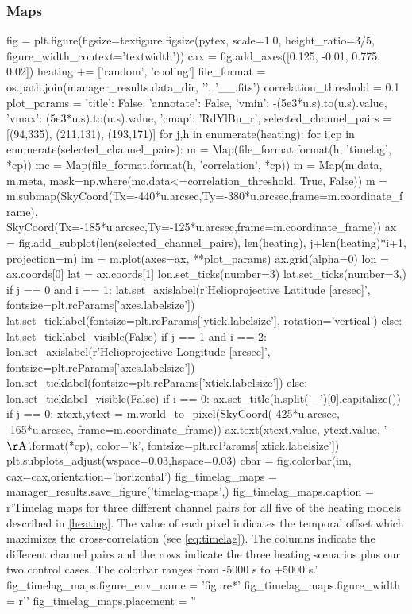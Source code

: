 \subsubsection{Maps}\label{timelag_maps}

\begin{pycode}
fig = plt.figure(figsize=texfigure.figsize(pytex, scale=1.0, height_ratio=3/5,
                                           figure_width_context='textwidth'))
cax = fig.add_axes([0.125, -0.01, 0.775, 0.02])
heating += ['random', 'cooling']
file_format = os.path.join(manager_results.data_dir, '{}', '{}_{}_{}.fits')
correlation_threshold = 0.1
plot_params = {'title': False, 'annotate': False, 'vmin': -(5e3*u.s).to(u.s).value,
               'vmax': (5e3*u.s).to(u.s).value, 'cmap': 'RdYlBu_r',}
selected_channel_pairs = [(94,335), (211,131), (193,171)]
for j,h in enumerate(heating):
    for i,cp in enumerate(selected_channel_pairs):
        m = Map(file_format.format(h, 'timelag', *cp))
        mc = Map(file_format.format(h, 'correlation', *cp))
        m = Map(m.data, m.meta, mask=np.where(mc.data<=correlation_threshold, True, False))
        m = m.submap(SkyCoord(Tx=-440*u.arcsec,Ty=-380*u.arcsec,frame=m.coordinate_frame),
                     SkyCoord(Tx=-185*u.arcsec,Ty=-125*u.arcsec,frame=m.coordinate_frame))
        ax = fig.add_subplot(len(selected_channel_pairs), len(heating), j+len(heating)*i+1,
                             projection=m)
        im = m.plot(axes=ax, **plot_params)
        ax.grid(alpha=0)
        lon = ax.coords[0]
        lat = ax.coords[1]
        lon.set_ticks(number=3)
        lat.set_ticks(number=3,) 
        if j == 0 and i == 1:
            lat.set_axislabel(r'Helioprojective Latitude [arcsec]', fontsize=plt.rcParams['axes.labelsize'])
            lat.set_ticklabel(fontsize=plt.rcParams['ytick.labelsize'], rotation='vertical')
        else:
            lat.set_ticklabel_visible(False)
        if j == 1 and i == 2:
            lon.set_axislabel(r'Helioprojective Longitude [arcsec]', fontsize=plt.rcParams['axes.labelsize'])
            lon.set_ticklabel(fontsize=plt.rcParams['xtick.labelsize'])
        else:
            lon.set_ticklabel_visible(False)
        if i == 0:
            ax.set_title(h.split('_')[0].capitalize())
        if j == 0:
            xtext,ytext = m.world_to_pixel(SkyCoord(-425*u.arcsec, -165*u.arcsec, frame=m.coordinate_frame))
            ax.text(xtext.value, ytext.value, '{}-{} $\mathrm{{\AA}}$'.format(*cp),
                    color='k', fontsize=plt.rcParams['xtick.labelsize'])
plt.subplots_adjust(wspace=0.03,hspace=0.03)
cbar = fig.colorbar(im, cax=cax,orientation='horizontal')
fig_timelag_maps = manager_results.save_figure('timelag-maps',)
fig_timelag_maps.caption = r'Timelag maps for three different channel pairs for all five of the heating models described in \autoref{heating}. The value of each pixel indicates the temporal offset which maximizes the cross-correlation (see \autoref{eq:timelag}). The columns indicate the different channel pairs and the rows indicate the three heating scenarios plus our two control cases. The colorbar ranges from -5000 s to +5000 s.'
fig_timelag_maps.figure_env_name = 'figure*'
fig_timelag_maps.figure_width = r'\textwidth'
fig_timelag_maps.placement = ''
\end{pycode}

